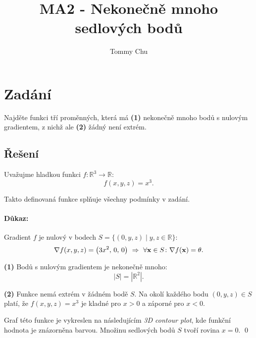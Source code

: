 \documentclass[a4paper]{article}
\title{MA2 - Nekonečně mnoho sedlových bodů}
\author{Tommy Chu}
\date{}
\begin{document}
\maketitle

\section*{Zadání}

Najděte funkci tří proměnných, která má \textbf{(1)} nekonečně mnoho bodů s nulovým gradientem, z nichž ale \textbf{(2)} žádný není extrém.

\subsection*{Řešení}

Uvažujme hladkou funkci $f \colon \mathbb{R}^3 \rightarrow \mathbb{R}$:
\[
    f(x,y,z) = x^3.
\]

Takto definovaná funkce splňuje všechny podmínky v zadání.

\paragraph*{Důkaz:}

Gradient $f$ je nulový v bodech ${ S = \bigl\{ (0,y,z) \mid y,z \in \mathbb{R} \bigr\} }$:
\[
    \nabla f(x,y,z) = \big(3x^2,\, 0,\, 0\big) \ \Rightarrow \
    \forall \vb x \in S \colon \nabla f(\vb x) = \theta.
\]

\textbf{(1)} Bodů s nulovým gradientem je nekonečně mnoho:
\[
    |S| = |\mathbb{R}^2|.
\]

\textbf{(2)} Funkce nemá extrém v žádném bodě $S$. Na okolí každého bodu ${(0,y,z) \in S}$ platí, že ${f(x,y,z) = x^3}$ je kladné pro ${x>0}$ a záporné pro ${x<0}$.

\medbreak
Graf této funkce je vykreslen na následujícím \emph{3D contour plot}, kde funkční hodnota je znázorněna barvou.
Množinu sedlových bodů $S$ tvoří rovina ${x=0}$.
\qed

\begin{center}
    
\end{center}
\end{document}
